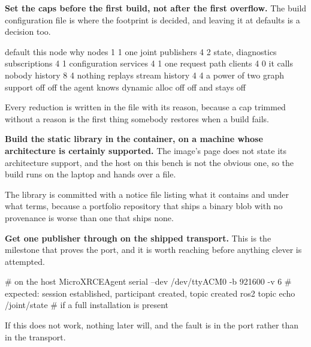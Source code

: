 \begin{steps}
\item \textbf{Set the caps before the first build, not after the first
overflow.} The build configuration file is where the footprint is decided, and
leaving it at defaults is a decision too.
\begin{plaincode}
default                         this node                    why
nodes            1              1                            one joint
publishers       4              2                            state, diagnostics
subscriptions    4              1                            configuration
services         4              1                            one request path
clients          4              0                            it calls nobody
history          8              4                            nothing replays
stream history   4              4                            a power of two
graph support    off            off                          the agent knows
dynamic alloc    off            off                          and stays off
\end{plaincode}
Every reduction is written in the file with its reason, because a cap trimmed
without a reason is the first thing somebody restores when a build fails.

\item \textbf{Build the static library in the container, on a machine whose
architecture is certainly supported.} The image's page does not state its
architecture support, and the host on this bench is not the obvious one, so the
build runs on the laptop and hands over a file.
The library is committed with a notice file listing what it contains and under
what terms, because a portfolio repository that ships a binary blob with no
provenance is worse than one that ships none.

\item \textbf{Get one publisher through on the shipped transport.} This is the
milestone that proves the port, and it is worth reaching before anything clever
is attempted.
\begin{shellcode}
# on the host
MicroXRCEAgent serial --dev /dev/ttyACM0 -b 921600 -v 6
# expected: session established, participant created, topic created
ros2 topic echo /joint/state        # if a full installation is present
\end{shellcode}
If this does not work, nothing later will, and the fault is in the port rather
than in the transport.


\end{steps}
